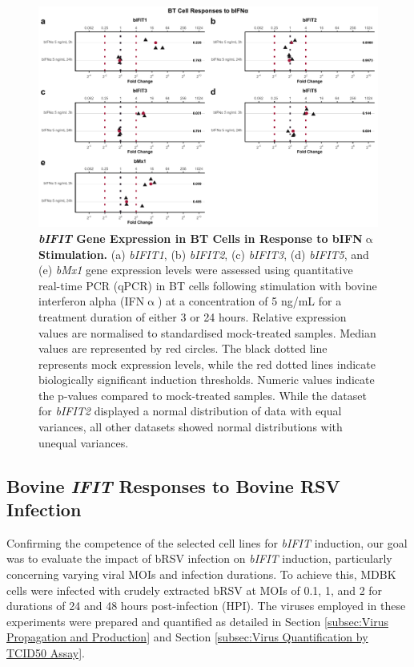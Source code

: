 \begin{figure}
    \centering
    \includegraphics[width=1\linewidth]{07. Chapter 2/Figs/02. Induction/08. bt_bifna.pdf}
    \caption[\textit{bIFIT} Gene Expression in BT Cells in Response to bIFN$\upalpha$ Stimulation.]{\textbf{\textit{bIFIT} Gene Expression in BT Cells in Response to bIFN$\upalpha$ Stimulation.} (a) \textit{bIFIT1}, (b) \textit{bIFIT2}, (c) \textit{bIFIT3}, (d) \textit{bIFIT5}, and (e) \textit{bMx1} gene expression levels were assessed using quantitative real-time PCR (qPCR) in BT cells following stimulation with bovine interferon alpha (IFN$\upalpha$) at a concentration of 5 ng/mL for a treatment duration of either 3 or 24 hours. Relative expression values are normalised to standardised mock-treated samples. Median values are represented by red circles. The black dotted line represents mock expression levels, while the red dotted lines indicate biologically significant induction thresholds. Numeric values indicate the p-values compared to mock-treated samples. While the dataset for \textit{bIFIT2} displayed a normal distribution of data with equal variances, all other datasets showed normal distributions with unequal variances.}
    \label{fig:BT responses to bifna}
\end{figure}

\subsection{Bovine \textit{IFIT} Responses to Bovine RSV Infection} \label{subsec:Bovine IFITs Responses to Bovine RSV Infection}
Confirming the competence of the selected cell lines for \textit{bIFIT} induction, our goal was to evaluate the impact of bRSV infection on \textit{bIFIT} induction, particularly concerning varying viral MOIs and infection durations. To achieve this, MDBK cells were infected with crudely extracted bRSV at MOIs of 0.1, 1, and 2 for durations of 24 and 48 hours post-infection (HPI). The viruses employed in these experiments were prepared and quantified as detailed in Section \ref{subsec:Virus Propagation and Production} and Section \ref{subsec:Virus Quantification by TCID50 Assay}.

